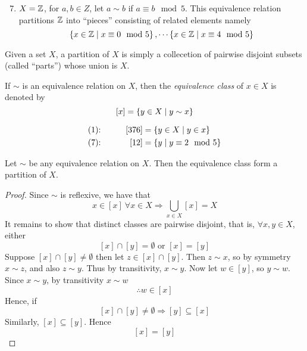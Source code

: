 \documentclass{article}
\begin{document}
\begin{eg}\leavevmode
    \begin{enumerate}[label=(\arabic*)]
        \setcounter{enumi}{6}
        \item $X = \mathbb{Z}$, for $a, b \in Z$, let $a \sim b$ if $a \equiv b \mod 5$.
        This equivalence relation partitions $\mathbb{Z}$ into ``pieces'' consisting of related elements namely
        \[
            \left\{ x \in \mathbb{Z} \mid x \equiv 0 \mod 5 \right\}, \cdots \left\{ x \in \mathbb{Z} \mid x \equiv 4 \mod 5 \right\}   
        \]
    \end{enumerate}
\end{eg}

\begin{defi}[Partition]
    Given a set $X$, a partition of $X$ is simply a collecetion of pairwise disjoint subsets 
    (called ``parts'') whose union is $X$.
\end{defi}

\begin{defi}
    If $\sim$ is an equivalence relation on $X$, 
    then the \emph{equivalence class} of $x \in X$ is denoted by
    \[
        [x] = \left\{ y \in X \mid y \sim x \right\}  
    \]
\end{defi}
\begin{eg} 
    \begin{alignat*}{3}
        \text{(1):}&& \qquad [376] &= \left\{ y \in X \mid y \in x \right\}  \\
        \text{(7):}&& \qquad [12] &= \left\{ y \mid y \equiv 2 \mod 5 \right\}
    \end{alignat*}
\end{eg}

\begin{nthm}\label{th:4-5}
    Let $\sim$ be any equivalence relation on $X$. 
    Then the equivalence class form a partition of $X$.
\end{nthm}
\begin{proof}
    Since $\sim$ is reflexive, we have that
    \[
        x \in [x] \ \forall x \in X \Longrightarrow \bigcup_{x \in X}[x] = X  
    \]
    It remains to show that distinct classes are pairwise disjoint,
    that is, $\forall x, y \in X$, either 
    \[
        [x] \cap [y] = \emptyset \text{ or } [x] = [y]
    \]
    Suppose $[x] \cap [y] \neq \emptyset$ then let $z \in [x] \cap [y]$.
    Then $z \sim x$, so by symmetry $x \sim z$, and also $z \sim y$.
    Thus by transitivity, $x \sim y$. 
    Now let $w \in [y]$, so $y \sim w$.
    Since $x \sim y$, by transitivity $x \sim w$
    \[
        \therefore w \in [x]    
    \]
    Hence, if 
    \[
        [x] \cap [y] \neq \emptyset \Longrightarrow [y] \subseteq [x]
    \]
    Similarly, $[x] \subseteq [y]$.
    Hence
    \[
        [x] = [y]  
    \]
\end{proof}
\end{document}
